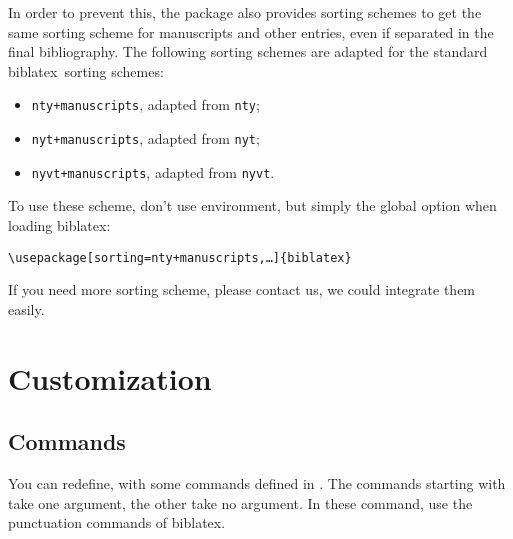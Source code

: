 \documentclass{ltxdockit}[2011/03/25]
\newcommand{\biblatex}{biblatex\xspace}
\begin{document}
In order to prevent this, the package also provides sorting schemes to get the same sorting scheme for manuscripts and other entries, even if separated in the final bibliography.
The following sorting schemes are adapted for the standard \biblatex\ sorting schemes:
\begin{itemize}
  \item \verb`nty+manuscripts`, adapted from \verb+nty+; 
  \item \verb-nyt+manuscripts-, adapted from \verb-nyt-;
  \item \verb-nyvt+manuscripts-, adapted from \verb-nyvt-.
\end{itemize}

To use these scheme, don't use  environment, but simply the global option when loading \biblatex:
\begin{verbatim}
\usepackage[sorting=nty+manuscripts,…]{biblatex}
\end{verbatim}

If you need more sorting scheme, please contact us, we could integrate them easily.
 
\section{Customization}

\subsection{Commands}

You can redefine, with  some commands defined in . The commands starting with  take one argument, the other take no argument. In these command, use the punctuation commands of \biblatex.
\end{document}
